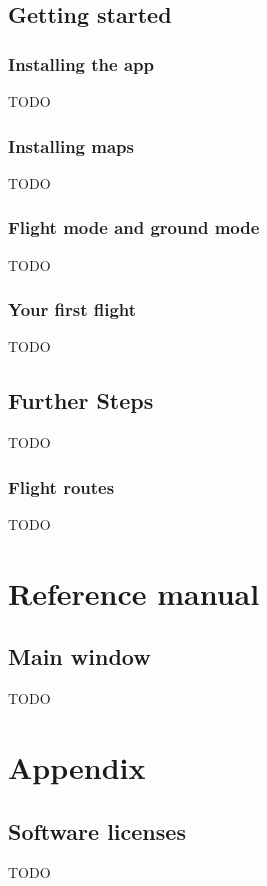\documentclass[letterpaper,10pt,english]{sphinxmanual}
\begin{document}
\chapter{Getting started}
\label{\detokenize{01-intro/getting_started:getting-started}}\label{\detokenize{01-intro/getting_started::doc}}

\section{Installing the app}
\label{\detokenize{01-intro/getting_started:installing-the-app}}
TODO


\section{Installing maps}
\label{\detokenize{01-intro/getting_started:installing-maps}}
TODO


\section{Flight mode and ground mode}
\label{\detokenize{01-intro/getting_started:flight-mode-and-ground-mode}}
TODO


\section{Your first flight}
\label{\detokenize{01-intro/getting_started:your-first-flight}}
TODO


\chapter{Further Steps}
\label{\detokenize{01-intro/further_steps:further-steps}}\label{\detokenize{01-intro/further_steps::doc}}
TODO


\section{Flight routes}
\label{\detokenize{01-intro/further_steps:flight-routes}}
TODO

\part{Reference manual}


\chapter{Main window}
\label{\detokenize{02-reference/main_window:main-window}}\label{\detokenize{02-reference/main_window::doc}}
TODO

\part{Appendix}


\chapter{Software licenses}
\label{\detokenize{03-appendix/licenses:software-licenses}}\label{\detokenize{03-appendix/licenses::doc}}
TODO



\renewcommand{\indexname}{Index}
\printindex
\end{document}
